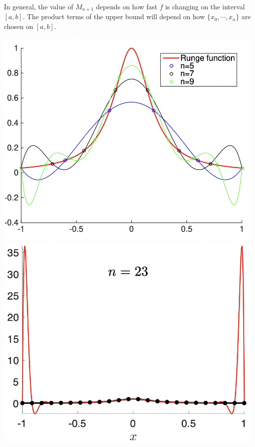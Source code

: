 \begin{marginfigure}
    In general, the value of $M_{n+1}$ depends on how fast $f$ is changing on the interval $[a,b]$. The product terms of the upper bound will depend on how $\{x_0, \cdots, x_n\}$ are chosen on $[a,b]$.
    \begin{center}
        \includegraphics[width=\textwidth]{figures/fig-13.png}
        \includegraphics[width=\textwidth]{figures/fig-14.png}

\end{center}
\end{marginfigure}
